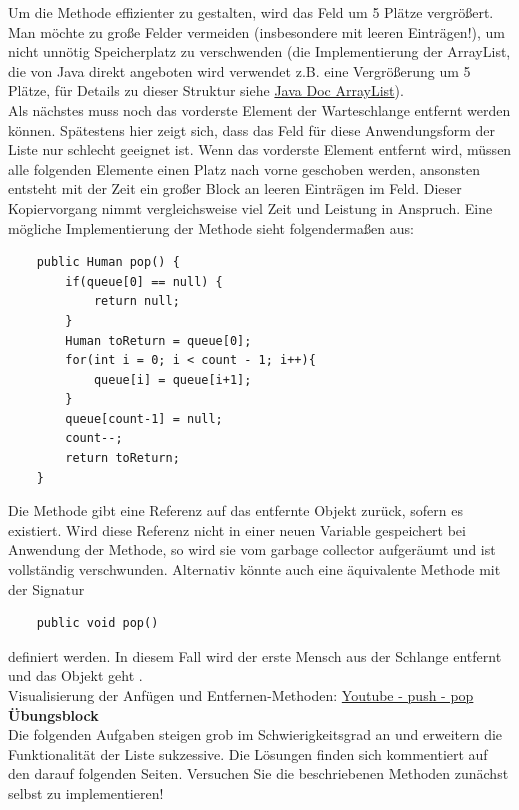 \documentclass{article}
\begin{document}
Um die Methode effizienter zu gestalten, wird das Feld um 5 Plätze vergrößert. Man möchte zu große
Felder vermeiden (insbesondere mit leeren Einträgen!), um nicht unnötig Speicherplatz zu verschwenden (die Implementierung der ArrayList, die von Java direkt angeboten wird verwendet z.B. eine Vergrößerung um 5 Plätze, für Details zu dieser  Struktur siehe \href{https://docs.oracle.com/en/java/javase/17/docs/api/java.base/java/util/ArrayList.html#add(E)}{Java Doc ArrayList}). \\
Als nächstes muss noch das vorderste Element der Warteschlange entfernt werden können. Spätestens
hier zeigt sich, dass das Feld für diese Anwendungsform der Liste nur schlecht geeignet ist. Wenn  
das vorderste Element entfernt wird, müssen alle folgenden Elemente einen Platz nach vorne geschoben werden, ansonsten entsteht mit der Zeit ein großer Block an leeren Einträgen im Feld. 
Dieser Kopiervorgang nimmt vergleichsweise viel Zeit und Leistung in Anspruch. Eine mögliche Implementierung
der Methode sieht folgendermaßen aus:

\begin{verbatim}
    public Human pop() {
        if(queue[0] == null) {
            return null;
        }
        Human toReturn = queue[0];
        for(int i = 0; i < count - 1; i++){
            queue[i] = queue[i+1];
        }
        queue[count-1] = null;
        count--;
        return toReturn;    
    }
\end{verbatim}

Die Methode gibt eine Referenz auf das entfernte Objekt zurück, sofern es existiert. Wird diese Referenz nicht in einer neuen 
Variable gespeichert bei Anwendung der Methode, so wird sie vom garbage collector aufgeräumt und ist 
vollständig verschwunden. Alternativ könnte auch eine äquivalente Methode mit der Signatur \\

\begin{verbatim}
    public void pop()
\end{verbatim}
definiert werden. In diesem Fall wird der erste Mensch aus der Schlange entfernt und das Objekt geht . \\
Visualisierung der Anfügen und Entfernen-Methoden: \href{https://youtu.be/e_XY3wmY02M}{Youtube - push - pop} \\

\textbf{Übungsblock} \\
Die folgenden Aufgaben steigen grob im Schwierigkeitsgrad an und erweitern die Funktionalität der 
Liste sukzessive. Die Lösungen finden sich kommentiert auf den darauf folgenden Seiten. Versuchen Sie die beschriebenen Methoden zunächst selbst zu implementieren!
\end{document}
